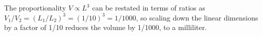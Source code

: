 The proportionality $V\propto L^3$ can be restated in terms of
ratios as $V_1/V_2=(L_1/L_2)^3=(1/10)^3=1/1000$, so
scaling down the linear dimensions by a factor of 1/10 reduces
the volume by 1/1000, to a milliliter.
